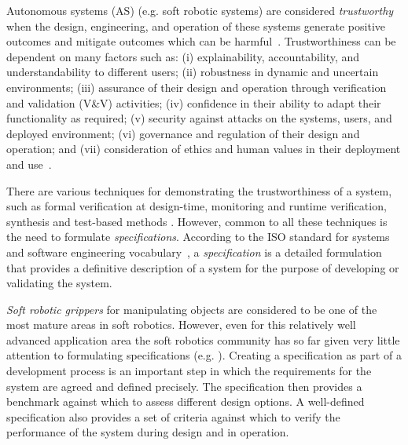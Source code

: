 \documentclass[letterpaper, 10 pt, conference]{ieeeconf}  %
\begin{document}
	
	Autonomous systems (AS) (e.g. soft robotic systems) are considered \emph{trustworthy} when the design, engineering, and operation of these systems generate positive outcomes and mitigate outcomes which can be harmful~\cite{Naiseh2022}.
	Trustworthiness can be dependent on many factors such as: (i) explainability, accountability, and understandability to different users; (ii) robustness in dynamic and uncertain environments; (iii) assurance of their design and operation through verification and validation (V\&V) activities; (iv) confidence in their ability to adapt their functionality as required; (v) security against attacks on the systems, users, and deployed environment; (vi) governance and regulation of their design and operation; and (vii) consideration of ethics and human values in their deployment and use~\cite{Naiseh2022}. 
	
	
	There are various techniques for demonstrating the trustworthiness of a system, such as formal verification at design-time, monitoring and runtime verification, synthesis and test-based methods \cite{Abeywickrama2022}. 
	However, common to all these techniques is the need to formulate \emph{specifications}. According to the ISO standard for systems and software engineering vocabulary~\cite{ISO24765:2017}, a \emph{specification} is a detailed formulation that provides a definitive description of a system for the purpose of developing or validating the system. 
	
	\emph{Soft robotic grippers} for manipulating objects are considered to be one of the most mature areas in soft robotics. 
	However, even for this relatively well advanced application area the soft robotics community has so far given very little attention to formulating specifications (e.g. \cite{Shi2023,Cheng2021,Liu2021,Chen2018,Cai2021,Hwang2020,Shin2021}).  Creating a specification as part of a development process is an important step in which the requirements for the system are agreed and defined precisely. %
	The specification then provides a benchmark against which to assess different design options. A well-defined specification also provides a set of criteria against which to verify the performance of the system during design and in operation.
	
\end{document}
